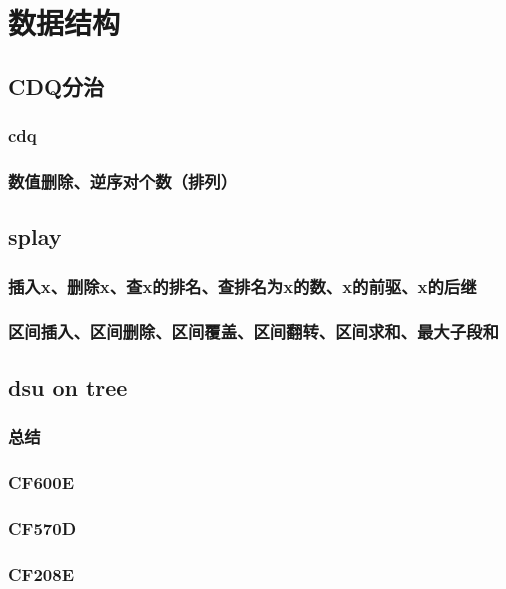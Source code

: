 \documentclass[10pt,a4paper]{article}
\begin{document}
	\section{数据结构}
	\subsection{CDQ分治}
	\subsubsection{cdq}
	
	\subsubsection{数值删除、逆序对个数（排列）}
	
	\subsection{splay}
	\subsubsection{插入x、删除x、查x的排名、查排名为x的数、x的前驱、x的后继}
	
	\subsubsection{区间插入、区间删除、区间覆盖、区间翻转、区间求和、最大子段和}
	
	\subsection{dsu on tree}
	\subsubsection{总结}
	
	\subsubsection{CF600E}
	
	\subsubsection{CF570D}
	
	\subsubsection{CF208E}
	
\end{document}

